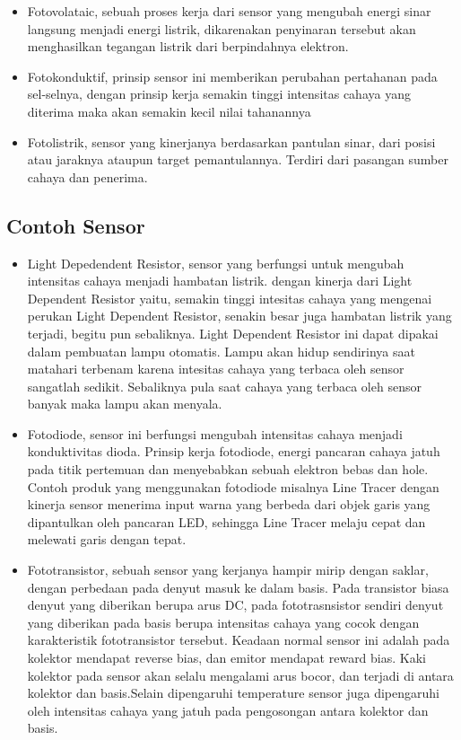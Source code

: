 	\begin{itemize}
	\item Fotovolataic, sebuah proses kerja dari sensor yang mengubah energi sinar langsung menjadi energi listrik, dikarenakan penyinaran tersebut akan menghasilkan tegangan listrik dari berpindahnya elektron.
	\item Fotokonduktif, prinsip sensor ini memberikan perubahan pertahanan pada sel-selnya, dengan prinsip kerja semakin tinggi intensitas cahaya yang diterima maka akan semakin kecil nilai tahanannya
	\item Fotolistrik, sensor yang kinerjanya berdasarkan pantulan sinar, dari posisi atau jaraknya ataupun target pemantulannya. Terdiri dari pasangan sumber cahaya dan penerima.
	\end {itemize}

\subsection{Contoh Sensor}
	\begin {itemize}
	\item Light Depedendent Resistor, sensor yang berfungsi untuk mengubah intensitas cahaya menjadi hambatan listrik. dengan kinerja dari Light Dependent Resistor yaitu, semakin tinggi intesitas cahaya yang mengenai perukan Light Dependent Resistor, senakin besar juga hambatan listrik yang terjadi, begitu pun sebaliknya. Light Dependent Resistor ini dapat dipakai dalam pembuatan lampu otomatis. Lampu akan hidup sendirinya saat matahari terbenam karena intesitas cahaya yang terbaca oleh sensor sangatlah sedikit. Sebaliknya pula saat cahaya yang terbaca oleh sensor banyak maka lampu akan menyala.
	\item Fotodiode, sensor ini berfungsi mengubah intensitas cahaya menjadi konduktivitas dioda. Prinsip kerja fotodiode, energi pancaran cahaya jatuh pada titik pertemuan dan menyebabkan sebuah elektron bebas dan hole. Contoh produk yang menggunakan fotodiode misalnya Line Tracer dengan kinerja sensor menerima input warna yang berbeda dari objek garis yang dipantulkan oleh pancaran LED, sehingga Line Tracer melaju cepat dan melewati garis dengan tepat.
	\item Fototransistor, sebuah sensor yang kerjanya hampir mirip dengan saklar, dengan perbedaan pada denyut masuk ke dalam basis. Pada transistor biasa denyut yang diberikan berupa arus DC, pada fototrasnsistor sendiri denyut yang diberikan pada basis berupa intensitas cahaya yang cocok dengan karakteristik fototransistor tersebut. Keadaan normal sensor ini adalah pada kolektor mendapat reverse bias, dan emitor mendapat reward bias. Kaki kolektor pada sensor akan selalu mengalami arus bocor, dan terjadi di antara kolektor dan basis.Selain dipengaruhi temperature sensor juga dipengaruhi oleh intensitas cahaya yang jatuh pada pengosongan antara kolektor dan basis.
	\end{itemize}
	
